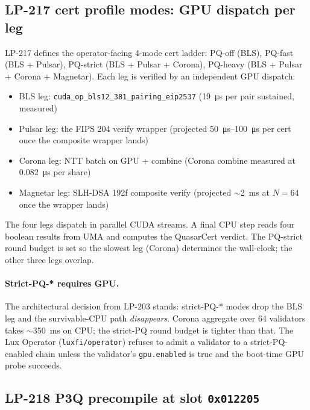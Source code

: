 \subsection{LP-217 cert profile modes: GPU dispatch per leg}

LP-217 \cite{lp217} defines the operator-facing 4-mode
cert ladder: PQ-off (BLS), PQ-fast (BLS + Pulsar), PQ-strict
(BLS + Pulsar + Corona), PQ-heavy (BLS + Pulsar + Corona +
Magnetar). Each leg is verified by an independent GPU dispatch:

\begin{itemize}[leftmargin=2em,nosep]
\item BLS leg: \texttt{cuda\_op\_bls12\_381\_pairing\_eip2537}
  (\SI{19}{\micro\second} per pair sustained, measured)
\item Pulsar leg: the FIPS 204 verify wrapper (projected
  \SI{50}{\micro\second}--\SI{100}{\micro\second} per cert
  once the composite wrapper lands)
\item Corona leg: NTT batch on GPU + combine (Corona combine
  measured at \SI{0.082}{\micro\second} per share)
\item Magnetar leg: SLH-DSA 192f composite verify (projected
  $\sim$\SI{2}{\milli\second} at $N{=}64$ once the wrapper
  lands)
\end{itemize}

The four legs dispatch in parallel CUDA streams. A final CPU
step reads four boolean results from UMA and computes the
QuasarCert verdict. The PQ-strict round budget is set so the
slowest leg (Corona) determines the wall-clock; the other
three legs overlap.

\paragraph{Strict-PQ-* requires GPU.} The architectural
decision from LP-203 stands: strict-PQ-* modes drop the BLS
leg and the survivable-CPU path \emph{disappears}. Corona
aggregate over 64 validators takes
$\sim$\SI{350}{\milli\second} on CPU; the strict-PQ round
budget is tighter than that. The Lux Operator
(\texttt{luxfi/operator}) refuses to admit a validator to a
strict-PQ-enabled chain unless the validator's
\texttt{gpu.enabled} is true and the boot-time GPU probe
succeeds.

\subsection{LP-218 P3Q precompile at slot \texttt{0x012205}}

